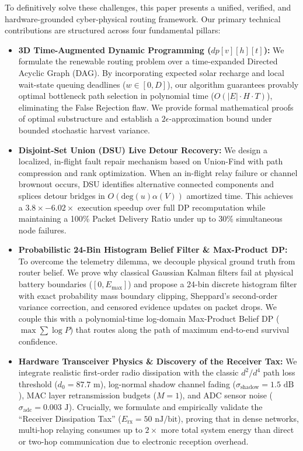 \documentclass[journal]{IEEEtran}
\begin{document}
To definitively solve these challenges, this paper presents a unified, verified, and hardware-grounded cyber-physical routing framework. Our primary technical contributions are structured across four fundamental pillars:
\begin{itemize}
    \item \textbf{3D Time-Augmented Dynamic Programming ($dp[v][h][t]$):} We formulate the renewable routing problem over a time-expanded Directed Acyclic Graph (DAG). By incorporating expected solar recharge and local wait-state queuing deadlines ($w \in [0, D]$), our algorithm guarantees provably optimal bottleneck path selection in polynomial time ($O(|E| \cdot H \cdot T)$), eliminating the False Rejection flaw. We provide formal mathematical proofs of optimal substructure and establish a $2\epsilon$-approximation bound under bounded stochastic harvest variance.
    \item \textbf{Disjoint-Set Union (DSU) Live Detour Recovery:} We design a localized, in-flight fault repair mechanism based on Union-Find with path compression and rank optimization. When an in-flight relay failure or channel brownout occurs, DSU identifies alternative connected components and splices detour bridges in $O(\text{deg}(u)\alpha(V))$ amortized time. This achieves a $3.8\times - 6.02\times$ execution speedup over full DP recomputation while maintaining a 100\% Packet Delivery Ratio under up to 30\% simultaneous node failures.
    \item \textbf{Probabilistic 24-Bin Histogram Belief Filter \& Max-Product DP:} To overcome the telemetry dilemma, we decouple physical ground truth from router belief. We prove why classical Gaussian Kalman filters fail at physical battery boundaries ($[0, E_{\max}]$) and propose a 24-bin discrete histogram filter with exact probability mass boundary clipping, Sheppard's second-order variance correction, and censored evidence updates on packet drops. We couple this with a polynomial-time log-domain Max-Product Belief DP ($\max \sum \log P$) that routes along the path of maximum end-to-end survival confidence.
    \item \textbf{Hardware Transceiver Physics \& Discovery of the Receiver Tax:} We integrate realistic first-order radio dissipation with the classic $d^2 / d^4$ path loss threshold ($d_0 = 87.7\text{ m}$), log-normal shadow channel fading ($\sigma_{\text{shadow}} = 1.5\text{ dB}$), MAC layer retransmission budgets ($M=1$), and ADC sensor noise ($\sigma_{\text{adc}} = 0.003\text{ J}$). Crucially, we formulate and empirically validate the ``Receiver Dissipation Tax'' ($E_{\text{rx}} = 50\text{ nJ/bit}$), proving that in dense networks, multi-hop relaying consumes up to $2\times$ more total system energy than direct or two-hop communication due to electronic reception overhead.
\end{itemize}
\end{document}
